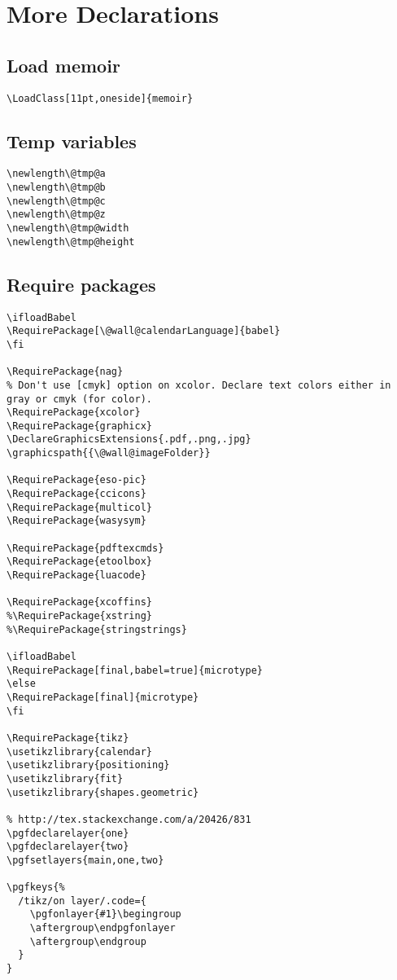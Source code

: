 \documentclass[11pt,oneside]{memoir-article}
\begin{document}
\chapter{More Declarations}
\label{sec:org08145ba}
\section{Load memoir}
\label{sec:org61d0f47}

\begin{verbatim}
\LoadClass[11pt,oneside]{memoir}
\end{verbatim}

\section{Temp variables}
\label{sec:org039c47a}

\begin{verbatim}
\newlength\@tmp@a
\newlength\@tmp@b
\newlength\@tmp@c
\newlength\@tmp@z
\newlength\@tmp@width
\newlength\@tmp@height
\end{verbatim}

\section{Require packages}
\label{sec:org11475bf}

\begin{verbatim}
\ifloadBabel
\RequirePackage[\@wall@calendarLanguage]{babel}
\fi

\RequirePackage{nag}
% Don't use [cmyk] option on xcolor. Declare text colors either in gray or cmyk (for color).
\RequirePackage{xcolor}
\RequirePackage{graphicx}
\DeclareGraphicsExtensions{.pdf,.png,.jpg}
\graphicspath{{\@wall@imageFolder}}

\RequirePackage{eso-pic}
\RequirePackage{ccicons}
\RequirePackage{multicol}
\RequirePackage{wasysym}

\RequirePackage{pdftexcmds}
\RequirePackage{etoolbox}
\RequirePackage{luacode}

\RequirePackage{xcoffins}
%\RequirePackage{xstring}
%\RequirePackage{stringstrings}

\ifloadBabel
\RequirePackage[final,babel=true]{microtype}
\else
\RequirePackage[final]{microtype}
\fi

\RequirePackage{tikz}
\usetikzlibrary{calendar}
\usetikzlibrary{positioning}
\usetikzlibrary{fit}
\usetikzlibrary{shapes.geometric}

% http://tex.stackexchange.com/a/20426/831
\pgfdeclarelayer{one}
\pgfdeclarelayer{two}
\pgfsetlayers{main,one,two}

\pgfkeys{%
  /tikz/on layer/.code={
    \pgfonlayer{#1}\begingroup
    \aftergroup\endpgfonlayer
    \aftergroup\endgroup
  }
}
\end{verbatim}
\end{document}
